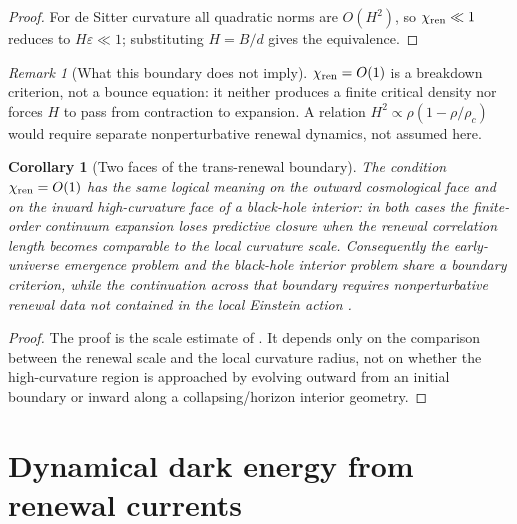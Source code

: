 \documentclass[11pt]{article}
\newtheorem{corollary}[theorem]{Corollary}
\theoremstyle{definition}
\theoremstyle{remark}
\newtheorem{remark}[theorem]{Remark}
\newcommand{\eps}{\varepsilon}
\begin{document}
\begin{proof}
For de Sitter curvature all quadratic norms are $O(H^2)$, so $\chi_{\rm ren}\ll1$
reduces to $H\eps\ll1$; substituting $H=B/d$ gives the equivalence.
\end{proof}

\begin{remark}[What this boundary does not imply]
\label{rem:no-bounce-from-boundary}
$\chi_{\rm ren}=O(1)$ is a breakdown criterion, not a bounce equation: it neither
produces a finite critical density nor forces $H$ to pass from contraction to
expansion.  A relation $H^2\propto\rho(1-\rho/\rho_c)$ would require separate
nonperturbative renewal dynamics, not assumed here.
\end{remark}


\begin{corollary}[Two faces of the trans-renewal boundary]
\label{cor:two-sided-trans-renewal}
The condition $\chi_{\rm ren}=O(1)$ has the same logical meaning on the outward
cosmological face and on the inward high-curvature face of a black-hole interior:
in both cases the finite-order continuum expansion loses predictive closure when
the renewal correlation length becomes comparable to the local curvature scale.
Consequently the early-universe emergence problem and the black-hole interior
problem share a boundary criterion, while the continuation across that boundary
requires nonperturbative renewal data not contained in the local Einstein action
\cite{PelissierBlackHoles}.
\end{corollary}

\begin{proof}
The proof is the scale estimate of .  It
depends only on the comparison between the renewal scale and the local curvature
radius, not on whether the high-curvature region is approached by evolving
outward from an initial boundary or inward along a collapsing/horizon interior
geometry.
\end{proof}


\section{Dynamical dark energy from renewal currents}
\label{sec:dark-energy}
\end{document}
